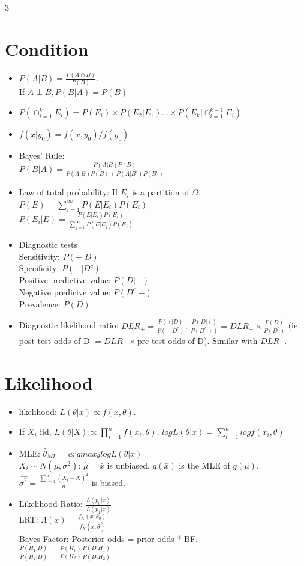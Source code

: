 \documentclass[a4paper,10pt]{article}
\begin{document}
\begin{multicols}{3}
\begin{itemize}
\end{itemize}

\section*{Condition}
\begin{itemize}
    \item $P(A|B)=\frac{P(A\cap B)}{P(B)}$. \\If $A\perp B,P(B|A)=P(B)$
    \item $P(\cap_{i=1}^kE_i)=P(E_i)\times P(E_2|E_1)...\times P(E_k|\cap_{i=1}^{k-1}E_i)$
    \item $f(x|y_0)=f(x,y_0)/f(y_0)$
    \item Bayes' Rule:\\ $P(B|A)=\frac{P(A|B)P(B)}{P(A|B)P(B)+P(A|B^c)P(B^c)}$\\
    \item Law of total probability: If $E_i$ is a partition of $\Omega$, \\$P(E)=\sum_{i=1}^\infty P(E|E_i)P(E_i)$\\
    $P(E_i|E)=\frac{P(E|E_i)P(E_i)}{\sum_{j=1}^\infty P(E|E_j)P(E_j)}$
    \item Diagnostic tests\\
    Sensitivity: $P(+|D)$ \\Specificity: $P(-|D^c)$\\
    Positive predictive value: $P(D|+)$\\
    Negative predicive value: $P(D^c|-)$\\
    Prevalence: $P(D)$
    \item Diagnostic likelihood ratio: $DLR_+=\frac{P(+|D)}{P(+|D^c)}$, $\frac{P(D|+)}{P(D^c|+)}=DLR_+ \times \frac{P(D)}{P(D^c)}$ (ie. post-test odds of D $=DLR_+\times $pre-test odds of D). Similar with $DLR_-$.
\end{itemize}

\section*{Likelihood}
\begin{itemize}
    \item likelihood: $L(\theta|x)\propto f(x,\theta)$.
    \item If $X_i$ iid, $L(\theta|X)\propto\prod_{i=1}^nf(x_i,\theta)$,
    $log{L(\theta|x)}=\sum_{i=1}^nlog{f(x_i,\theta)}$
    \item MLE: $\hat{\theta}_{ML}=argmax_\theta logL(\theta|x)$\\
    $X_i \sim N(\mu,\sigma^2)$: $\hat{\mu}=\bar{x}$ is unbiased, $g(\bar{x})$ is the MLE of $g(\mu)$. $\hat{\sigma^2}=\frac{\sum_{i=1}^n(X_i-\bar{X})^2}{n}$ is biased.
    \item 
    Likelihood Ratio: $\frac{L(p_0|x)}{L(p_1|x)}$\\
    LRT: $\Lambda(x)=\frac{f_X(x;\theta_0)}{f_X(x;\hat{\theta})}$\\
    Bayes Factor: Posterior odds = prior odds * BF.\\
    $\frac{P(H_1|D)}{P(H_2|D)}=\frac{P(H_1)}{P(H_2)}\frac{P(D|H_1)}{P(D|H_2)}$
\end{itemize}


\end{multicols}
\end{document}
